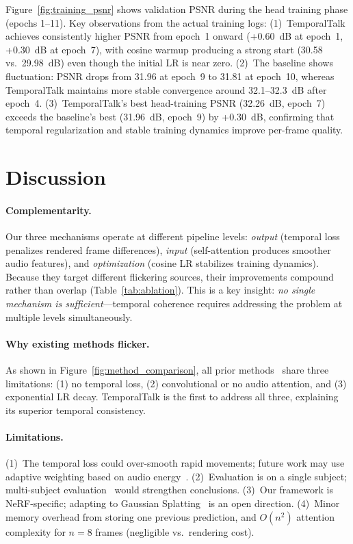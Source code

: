 \documentclass[10pt,twocolumn,letterpaper]{article}
\begin{document}
Figure~\ref{fig:training_psnr} shows validation PSNR during the head training phase (epochs 1--11).
Key observations from the actual training logs:
(1)~TemporalTalk achieves consistently higher PSNR from epoch~1 onward (+0.60~dB at epoch~1, +0.30~dB at epoch~7), with cosine warmup producing a strong start (30.58 vs.\ 29.98~dB) even though the initial LR is near zero.
(2)~The baseline shows fluctuation: PSNR drops from 31.96 at epoch~9 to 31.81 at epoch~10, whereas TemporalTalk maintains more stable convergence around 32.1--32.3~dB after epoch~4.
(3)~TemporalTalk's best head-training PSNR (32.26~dB, epoch~7) exceeds the baseline's best (31.96~dB, epoch~9) by +0.30~dB, confirming that temporal regularization and stable training dynamics improve per-frame quality.


\section{Discussion}
\label{sec:discussion}

\paragraph{Complementarity.}
Our three mechanisms operate at different pipeline levels: \emph{output} (temporal loss penalizes rendered frame differences), \emph{input} (self-attention produces smoother audio features), and \emph{optimization} (cosine LR stabilizes training dynamics).
Because they target different flickering sources, their improvements compound rather than overlap (Table~\ref{tab:ablation}).
This is a key insight: \emph{no single mechanism is sufficient}---temporal coherence requires addressing the problem at multiple levels simultaneously.

\paragraph{Why existing methods flicker.}
As shown in Figure~\ref{fig:method_comparison}, all prior methods~\cite{guo2021adnerf,ye2023geneface,tang2022radnerf,li2023ernerf,peng2024synctalk} share three limitations: (1) no temporal loss, (2) convolutional or no audio attention, and (3) exponential LR decay.
TemporalTalk is the first to address all three, explaining its superior temporal consistency.

\paragraph{Limitations.}
(1)~The temporal loss could over-smooth rapid movements; future work may use adaptive weighting based on audio energy~\cite{hsu2021hubert}.
(2)~Evaluation is on a single subject; multi-subject evaluation~\cite{peng2024synctalk,lu2021lsp} would strengthen conclusions.
(3)~Our framework is NeRF-specific; adapting to Gaussian Splatting~\cite{kerbl20233dgs,yu2024gaussiantalker,li2024talkinggaussian} is an open direction.
(4)~Minor memory overhead from storing one previous prediction, and $O(n^2)$ attention complexity for $n{=}8$ frames (negligible vs.\ rendering cost).
\end{document}

